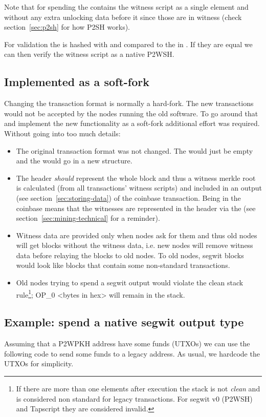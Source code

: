 Note that for spending the  contains the witness script as a single element and without any extra unlocking data before it since those are in witness (check section~\ref{sec:p2sh} for how P2SH works).

For validation the  is hashed with  and compared to the  in . If they are equal we can then verify the witness script as a native P2WSH.


\subsection*{Implemented as a soft-fork}
Changing the transaction format is normally a hard-fork. The new transactions would not be accepted by the nodes running the old software. To go around that and implement the new functionality as a soft-fork additional effort was required. Without going into too much details:


\begin{itemize}
\item The original transaction format was not changed. The  would just be empty and the  would go in a new structure.
\item The header \emph{should} represent the whole block and thus a witness merkle root is calculated (from all transactions' witness scripts) and included in an  output (see section~\ref{sec:storing-data}) of the coinbase transaction. Being in the coinbase means that the witnesses are represented in the header via the  (see section~\ref{sec:mining-technical} for a reminder).
\item Witness data are provided only when nodes ask for them and thus old nodes will get blocks without the witness data, i.e. new nodes will remove witness data before relaying the blocks to old nodes. To old nodes, segwit blocks would look like blocks that contain some non-standard transactions.
\item Old nodes trying to spend a segwit output would violate the clean stack rule\footnote{If there are more than one elements after execution the stack is not \emph{clean} and is considered non standard for legacy transactions. For segwit v0 (P2WSH) and Tapscript they are considered invalid.}; OP\_0 <bytes in hex> will remain in the stack.
\end{itemize}


\subsection*{Example: spend a native segwit output type}
Assuming that a P2WPKH address have some funds (UTXOs) we can use the following code to send some funds to a legacy address. As usual, we hardcode the UTXOs for simplicity.


